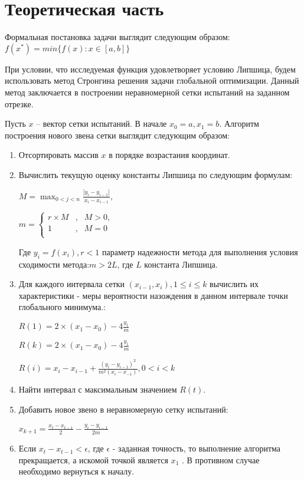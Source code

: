 \documentclass{report}
\begin{document}
\section*{Теоретическая часть}
Формальная постановка задачи выглядит следующим образом:
$f({x}^{\ast}) = min \{f(x):x \in [a,b]\}$
\par При условии, что исследуемая функция удовлетворяет условию Липшица, будем использовать метод Стронгина решения задачи глобальной оптимизации. Данный метод заключается в построении неравномерной сетки испытаний на заданном отрезке.
\par Пусть $x$ – вектор сетки испытаний. В начале $x_0 = a, x_1 = b$. Алгоритм построения нового звена сетки выглядит следующим образом:
\begin{enumerate}
	\item Отсортировать массив $x$ в порядке возрастания координат.
	\item Вычислить текущую оценку константы Липшица по следующим формулам: \par
	$M = \max_{0<j<n}\frac{|y_i - y_{i-1} |}{x_i - x_{i-1}},$\par
	$
	m =\left\{
	\begin{array}{rcl}
		r \times{} M&,&M > 0,\\
		1& , &M = 0\\
	\end{array}
	\right.
	$ \par
	Где $y_i = f(x_i), r < 1$ параметр надежности метода для выполнения условия сходимости метода:$m > 2L$, где $L$ константа Липшица.
	\item Для каждого интервала сетки $(x_{i-1},x_i), 1 \leq i \leq k$ вычислить их характеристики - меры вероятности назождения в данном интервале точки глобального минимума.: \par
	$R(1) = 2\times{}(x_1 - x_0) - 4\frac{y_1}{m}$ \par
	$R(k) = 2\times{}(x_1 - x_0) - 4\frac{y_1}{m}$ \par
	$R(i) = x_i - x_{i-1} + \frac{({y_i - y_{i-1}})^2}{m^2(x_i-x_{-1})}, 0 < i < k$ \par
	\item Найти интервал с максимальным значением $R(t)$.\par
	\item Добавить новое звено в неравномерную сетку испытаний:\par
	$x_{k+1} = \frac{x_t - x_{t -1}}{2} - \frac{y_i - y_{i - 1}}{2m}$
	\item Если $x_t - x_{t -1} < \epsilon$, где  $\epsilon$ - заданная точность, то выполнение алгоритма прекращается, а искомой точкой является $x_1$ . В противном случае необходимо вернуться к началу.
\end{enumerate}
\newpage
\end{document}
